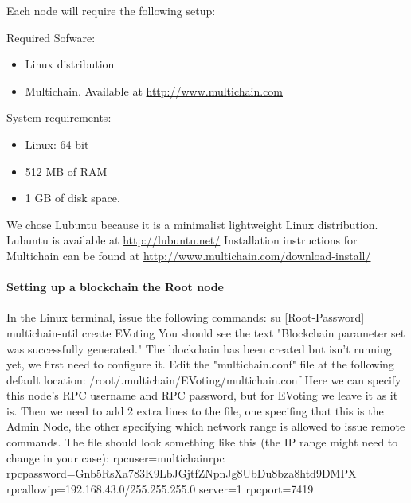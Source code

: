 \documentclass[11pt]{article}
\begin{document}
	Each node will require the following setup:
	
	Required Sofware:
	\begin{itemize}
		\item Linux distribution
		\item Multichain. Available at \url{http://www.multichain.com}
	\end{itemize}
	
	System requirements:
	\begin{itemize}
		\item Linux: 64-bit
		\item 512 MB of RAM
		\item 1 GB of disk space.
	\end{itemize}
	
	We chose Lubuntu because it is a minimalist lightweight Linux distribution. Lubuntu is available at \url{http://lubuntu.net/}\newline
	Installation instructions for Multichain can be found at \url{http://www.multichain.com/download-install/}\newline\newline
	
	\paragraph{Setting up a blockchain the Root node}
	
	In the Linux terminal, issue the following commands:\newline\newline
	su [Root-Password]\newline
	multichain-util create EVoting\newline\newline
	You should see the text "Blockchain parameter set was successfully generated."\newline
	The blockchain has been created but isn't running yet, we first need to configure it.\newline
	Edit the "multichain.conf" file at the following default location:\newline
	/root/.multichain/EVoting/multichain.conf\newline
	Here we can specify this node's RPC username and RPC password, but for EVoting we leave it as it is. Then we need to add 2 extra lines to the file, one specifing that this is the Admin Node, the other specifying which network range is allowed to issue remote commands. The file should look something like this (the IP range might need to change in your case):\newline
	rpcuser=multichainrpc\newline
	rpcpassword=Gnb5RsXa783K9LbJGjtfZNpnJg8UbDu8bza8htd9DMPX\newline
	rpcallowip=192.168.43.0/255.255.255.0\newline
	server=1\newline
	rpcport=7419\newline\newline
	
\end{document}
